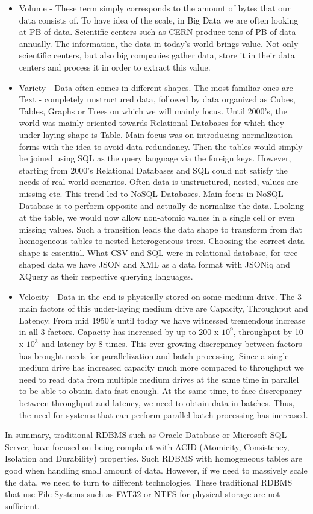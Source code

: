 \begin{itemize}
	\item Volume - These term simply corresponds to the amount of bytes that our data consists of. To have idea of the scale, in Big Data we are often looking at PB of data. Scientific centers such as CERN produce tens of PB of data annually. The information, the data in today's world brings value. Not only scientific centers, but also big companies gather data, store it in their data centers and process it in order to extract this value.
	\item Variety - Data often comes in different shapes. The most familiar ones are Text - completely unstructured data, followed by data organized as Cubes, Tables, Graphs or Trees on which we will mainly focus. Until 2000's, the world was mainly oriented towards Relational Databases for which they under-laying shape is Table. Main focus was on introducing normalization forms with the idea to avoid data redundancy. Then the tables would simply be joined using SQL as the query language via the foreign keys. However, starting from 2000's Relational Databases and SQL could not satisfy the needs of real world scenarios. Often data is unstructured, nested, values are missing etc. This trend led to NoSQL Databases. Main focus in NoSQL Database is to perform opposite and actually de-normalize the data. Looking at the table, we would now allow non-atomic values in a single cell or even missing values. Such a transition leads the data shape to transform from flat homogeneous tables to nested heterogeneous trees. Choosing the correct data shape is essential. What CSV and SQL were in relational database, for tree shaped data we have JSON and XML as a data format with JSONiq and XQuery as their respective querying languages.
	\item Velocity - Data in the end is physically stored on some medium drive. The 3 main factors of this under-laying medium drive are Capacity, Throughput and Latency. From mid 1950's until today we have witnessed tremendous increase in all 3 factors. Capacity has increased by up to 200 x $10^9$, throughput by 10 x $10^3$  and latency by 8 times. This ever-growing discrepancy between factors has brought needs for parallelization and batch processing. Since a single medium drive has increased capacity much more compared to throughput we need to read data from multiple medium drives at the same time in parallel to be able to obtain data fast enough. At the same time, to face discrepancy between throughput and latency, we need to obtain data in batches. Thus, the need for systems that can perform parallel batch processing has increased. 
\end{itemize}
In summary, traditional RDBMS such as Oracle Database or Microsoft SQL Server, have focused on being complaint with ACID (Atomicity, Consistency, Isolation and Durability) properties. Such RDBMS with homogeneous tables are good when handling small amount of data. However, if we need to massively scale the data, we need to turn to different technologies. These traditional RDBMS that use File Systems such as FAT32 or NTFS for physical storage are not sufficient. 

